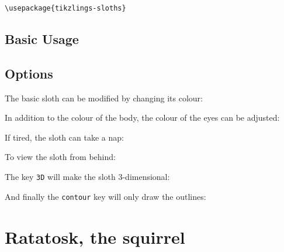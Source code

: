\documentclass[parskip=half]{scrartcl}
\begin{document}
\begin{tcolorbox}[lower separated=false, lefthand width=.8\linewidth]
\vspace*{0.5cm}
\lstinline|\usepackage{tikzlings-sloths}| 
\vspace*{0.5cm}
\end{tcolorbox}

\subsection{Basic Usage}

\begin{tcblisting}{}
\sloth
\end{tcblisting}

\subsection{Options}

The basic sloth can be modified by changing its colour:
\begin{tcblisting}{}
\sloth[body=blue]
\end{tcblisting}

In addition to the colour of the body, the colour of the eyes can be adjusted:
\begin{tcblisting}{}
\sloth[eye=red]
\end{tcblisting}

If tired, the sloth can take a nap:
\begin{tcblisting}{}
\sloth[sleeping]
\end{tcblisting}

To view the sloth from behind:
\begin{tcblisting}{}
\sloth[back]
\end{tcblisting}

The key \lstinline|3D| will make the sloth 3-dimensional:
\begin{tcblisting}{}
\sloth[3D]
\end{tcblisting}

And finally the \lstinline|contour| key will only draw the outlines:
\begin{tcblisting}{}
\sloth[contour=black]
\end{tcblisting}

%
%
\clearpage
\section[Squirrel]{Ratatosk, the squirrel}
\end{document}
